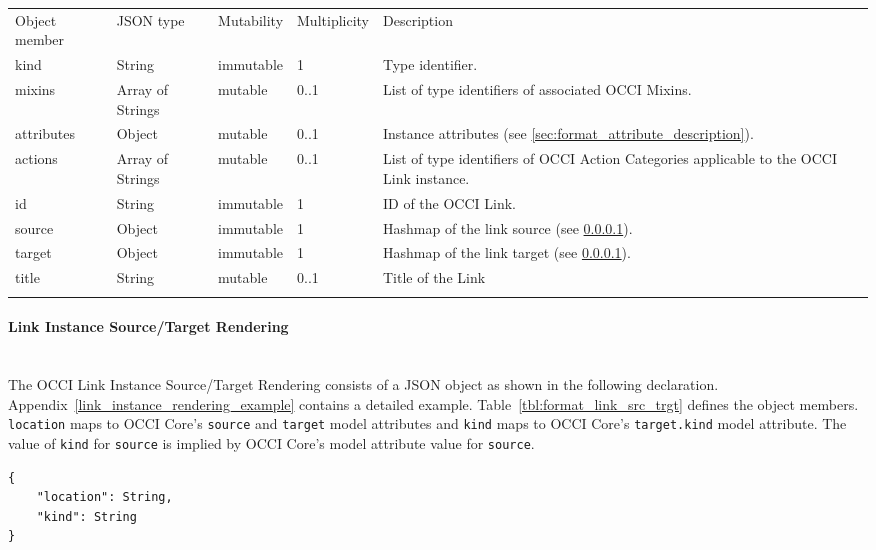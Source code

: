 \documentclass[10pt,a4paper]{article}
\begin{document}
 {
    \begin{tabularx}{\textwidth}{llllX}
    \toprule
    Object member & JSON type         & Mutability  & Multiplicity  & Description \\
    \colrule
    kind          & String            & immutable   & 1             & Type identifier. \\

    mixins        & Array of Strings  & mutable     & 0..1          & List of type identifiers of associated OCCI Mixins. \\

    attributes    & Object            & mutable     & 0..1          & Instance attributes (see \ref{sec:format_attribute_description}). \\

    actions       & Array of Strings  & mutable     & 0..1          & List of type identifiers of OCCI Action Categories applicable to the OCCI Link instance. \\

    id            & String            & immutable   & 1             & ID of the OCCI Link.\\

    source        & Object            & immutable   & 1             & Hashmap of the link source (see \ref{par:format_link_src_trgt}). \\

    target        & Object            & immutable   & 1             & Hashmap of the link target (see \ref{par:format_link_src_trgt}). \\

    title         & String            & mutable     & 0..1          & Title of the Link \\
    \botrule
    \end{tabularx}
}

\paragraph{Link Instance Source/Target Rendering}
\label{par:format_link_src_trgt}\hfill\\

The OCCI Link Instance Source/Target Rendering consists of a JSON object as shown in the
following declaration. Appendix~\ref{link_instance_rendering_example} contains a detailed example.
Table~\ref{tbl:format_link_src_trgt} defines the object members. {\tt location} maps to OCCI
Core's {\tt source} and {\tt target} model attributes and {\tt kind} maps to OCCI Core's {\tt target.kind}
model attribute. The value of {\tt kind} for {\tt source} is implied by OCCI Core's model attribute value
for {\tt source}.
\begin{lstlisting}
{
    "location": String,
    "kind": String
}
\end{lstlisting}
\end{document}
